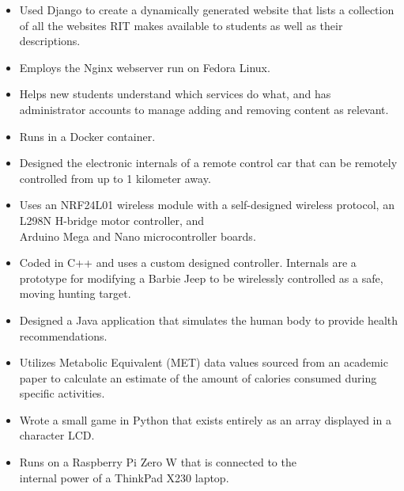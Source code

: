 \documentclass[11pt,letterpaper,ragged2e]{altacv}
\begin{document}
\begin{itemize}
\item Used Django to create a dynamically generated website that lists a collection of all the websites RIT makes available to students as well as their descriptions.
\item Employs the Nginx webserver run on Fedora Linux.
\item Helps new students understand which services do what, and has administrator accounts to manage adding and removing content as relevant.
\item Runs in a Docker container.
\end{itemize}
\smallskip
\smallskip
{}
\begin{itemize}
\item Designed the electronic internals of a remote control car that can be remotely controlled from up to 1 kilometer away.
\item Uses an NRF24L01 wireless module with a self-designed wireless protocol, an L298N H-bridge motor controller, and \\ Arduino Mega and Nano microcontroller boards.
\item Coded in C++ and uses a custom designed controller. Internals are a prototype for modifying a Barbie Jeep to be wirelessly controlled as a safe, moving hunting target.
\end{itemize}
\smallskip
\smallskip
{}
\begin{itemize}
\item Designed a Java application that simulates the human body to provide health recommendations.
\item Utilizes Metabolic Equivalent (MET) data values sourced from an academic paper to calculate an estimate of the amount of calories consumed during specific activities.
\end{itemize}
\smallskip
\smallskip
{}
\begin{itemize}
\item Wrote a small game in Python that exists entirely as an array displayed in a character LCD.
\item Runs on a Raspberry Pi Zero W that is connected to the \\ internal power of a ThinkPad X230 laptop.
\end{itemize}
\end{document}
